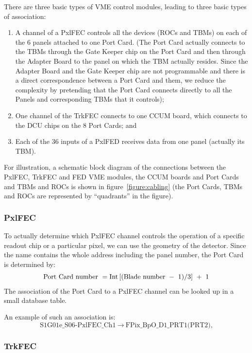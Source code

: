 \documentclass{cmspaper}
\begin{document}
There are three basic types of VME control modules, leading to three basic
types of association:
\begin{enumerate}
\item A channel of a PxlFEC controls all the devices (ROCs and TBMs) on each 
of the 6 panels attached to one Port Card. (The Port Card actually connects 
to the TBMs through the Gate Keeper chip on the Port Card and then through the 
Adapter Board to the panel on which the TBM actually resides. 
Since the Adapter Board and the Gate Keeper chip are not programmable and there is
a direct correspondence between a Port Card and them, we reduce the 
complexity by pretending that the Port Card connects directly to all the 
Panels and corresponding TBMs that it controls);
\item One channel of the TrkFEC connects to one CCUM board,
      which connects to the DCU chips on the 8 Port Cards; and
\item Each of the 36 inputs of a PxlFED receives data from one 
panel (actually its TBM).  
\end{enumerate}

For illustration, a schematic block diagram of the connections between the PxlFEC, TrkFEC and FED VME modules,
the CCUM boards and Port Cards and TBMs and ROCs is shown in figure~\ref{figure:cabling}
(the Port Cards, TBMs and ROCs are represented by ``quadrants'' in the figure).


\subsubsection{PxlFEC}

To actually determine which PxlFEC channel controls the operation of a 
specific readout chip or a particular pixel, we can use the geometry of
the detector. Since the name contains the whole address including the  panel 
number, the Port Card is determined by:
\begin{equation}
{\rm Port \ Card \ number} \ = {\rm Int} \, 
[({\rm Blade \  number} \ - \ 1 )/3] \ + \ 1
\end{equation}
The association of the Port Card to a PxlFEC channel can be looked up in a 
small database table.

An example of such an association is:
\begin{displaymath}
\mbox{S1G01e\_S06-PxlFEC\_Ch1}\ \rightarrow\ \mbox{FPix\_BpO\_D1\_PRT1(PRT2),}
\end{displaymath}


\subsubsection{TrkFEC}
\end{document}
